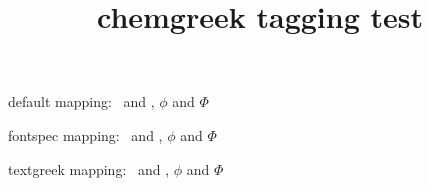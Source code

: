 \documentclass{article}
\title{chemgreek tagging test}
\begin{document}
default mapping: \chemphi\ and \chemPhi, $\phi$ and $\Phi$

\printchemgreekalphabet

fontspec mapping: \chemphi\ and \chemPhi, $\phi$ and $\Phi$

\printchemgreekalphabet

textgreek mapping: \chemphi\ and \chemPhi, $\phi$ and $\Phi$

\printchemgreekalphabet
\end{document}
